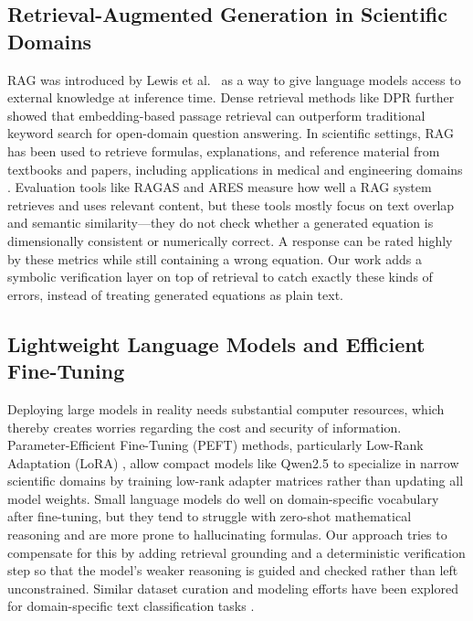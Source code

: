 \documentclass[a4paper,fleqn]{cas-sc}
\begin{document}
\subsection{Retrieval-Augmented Generation in Scientific Domains}
RAG was introduced by Lewis et al.\ \citep{RAG-Lewis} as a way to give language models access to external knowledge at inference time. Dense retrieval methods like DPR \citep{DPR-Karpukhin} further showed that embedding-based passage retrieval can outperform traditional keyword search for open-domain question answering. In scientific settings, RAG has been used to retrieve formulas, explanations, and reference material from textbooks and papers, including applications in medical \citep{Amrita-RAG-Medical} and engineering domains \citep{Engineering-RAG, Amrita-Vinayakumar-2018}. Evaluation tools like RAGAS \citep{RAGAS-Es} and ARES \citep{ARES-ACL} measure how well a RAG system retrieves and uses relevant content, but these tools mostly focus on text overlap and semantic similarity—they do not check whether a generated equation is dimensionally consistent or numerically correct. A response can be rated highly by these metrics while still containing a wrong equation. Our work adds a symbolic verification layer on top of retrieval to catch exactly these kinds of errors, instead of treating generated equations as plain text.

\subsection{Lightweight Language Models and Efficient Fine-Tuning}
Deploying large models in reality needs substantial computer resources, which thereby creates worries regarding the cost and security of information. Parameter-Efficient Fine-Tuning (PEFT) methods, particularly Low-Rank Adaptation (LoRA) \citep{LoRA-Hu}, allow compact models like Qwen2.5 \citep{Qwen-Report} to specialize in narrow scientific domains by training low-rank adapter matrices rather than updating all model weights. Small language models do well on domain-specific vocabulary after fine-tuning, but they tend to struggle with zero-shot mathematical reasoning and are more prone to hallucinating formulas. Our approach tries to compensate for this by adding retrieval grounding and a deterministic verification step so that the model’s weaker reasoning is guided and checked rather than left unconstrained. Similar dataset curation and modeling efforts have been explored for domain-specific text classification tasks \citep{Amrita-Naveenkumar-2020}.
\end{document}
